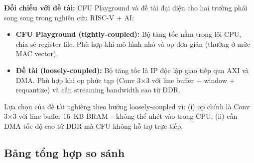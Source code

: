 \textbf{Đối chiếu với đề tài:} CFU Playground và đề tài đại diện cho hai trường phái song song trong nghiên cứu RISC-V + AI:
\begin{itemize}
    \item \textbf{CFU Playground (tightly-coupled):} Bộ tăng tốc nằm trong lõi CPU, chia sẻ register file. Phù hợp khi mô hình nhỏ và op đơn giản (thường ở mức MAC vector).
    \item \textbf{Đề tài (loosely-coupled):} Bộ tăng tốc là IP độc lập giao tiếp qua AXI và DMA. Phù hợp khi op phức tạp (Conv 3$\times$3 với line buffer + window + requantize) và cần streaming bandwidth cao từ DDR.
\end{itemize}
Lựa chọn của đề tài nghiêng theo hướng loosely-coupled vì: (i) op chính là Conv 3$\times$3 với line buffer 16~KB BRAM -- không thể nhét vào trong CPU; (ii) cần DMA tốc độ cao từ DDR mà CFU không hỗ trợ trực tiếp.

\subsection{Bảng tổng hợp so sánh}
\begin{table}[!h]
    \centering
    \caption{So sánh đa chiều các framework gia tốc CNN trên FPGA.}
    \label{tab:framework_comparison}
\end{table}

